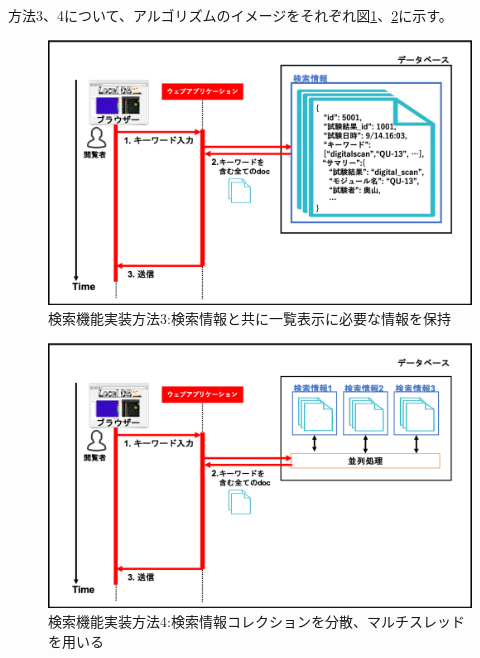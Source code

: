 方法3、4について、アルゴリズムのイメージをそれぞれ図\ref{search_summary_hash}、\ref{search_multi_thread}に示す。

\begin{figure}[bpt]
  \begin{center}
    \includegraphics[width=16cm]{search_summary_hash}
  \caption[検索機能実装方法3:検索情報と共に一覧表示に必要な情報を保持]{検索機能実装方法3:検索情報と共に一覧表示に必要な情報を保持}
  \label{search_summary_hash}
  \end{center}
\end{figure}

\begin{figure}[bpt]
  \begin{center}
    \includegraphics[width=16cm]{search_multi_thread}
  \caption[検索機能実装方法4:検索情報コレクションを分散、マルチスレッドを用いる]{検索機能実装方法4:検索情報コレクションを分散、マルチスレッドを用いる}
  \label{search_multi_thread}
  \end{center}
\end{figure}

